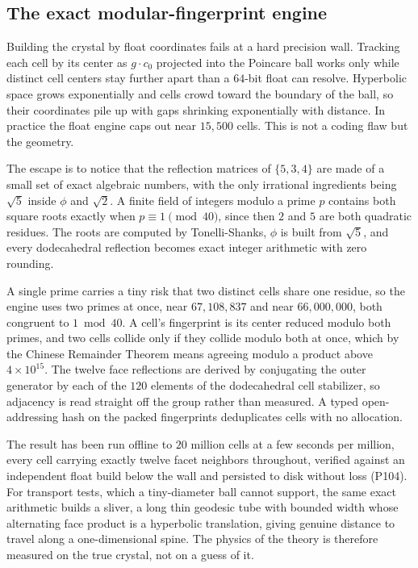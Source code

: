 \subsection{The exact modular-fingerprint engine}

Building the crystal by float coordinates fails at a hard precision wall. Tracking each cell by its center as
$g \cdot c_0$ projected into the Poincare ball works only while distinct cell centers stay further apart than
a $64$-bit float can resolve. Hyperbolic space grows exponentially and cells crowd toward the boundary of the
ball, so their coordinates pile up with gaps shrinking exponentially with distance. In practice the float
engine caps out near $15{,}500$ cells. This is not a coding flaw but the geometry.

The escape is to notice
that the reflection matrices of $\{5,3,4\}$ are made of a small set of exact algebraic numbers, with the only
irrational ingredients being $\sqrt5$ inside $\phi$ and $\sqrt2$. A finite field of integers modulo a prime
$p$ contains both square roots exactly when $p \equiv 1 \pmod{40}$, since then $2$ and $5$ are both quadratic
residues. The roots are computed by Tonelli-Shanks, $\phi$ is built from $\sqrt5$, and every dodecahedral
reflection becomes exact integer arithmetic with zero rounding.

A single prime carries a tiny risk that two
distinct cells share one residue, so the engine uses two primes at once, near $67{,}108{,}837$ and near
$66{,}000{,}000$, both congruent to $1 \bmod 40$. A cell's fingerprint is its center reduced modulo both
primes, and two cells collide only if they collide modulo both at once, which by the Chinese Remainder
Theorem means agreeing modulo a product above $4 \times 10^{15}$. The twelve face reflections are derived by
conjugating the outer generator by each of the $120$ elements of the dodecahedral cell stabilizer, so
adjacency is read straight off the group rather than measured. A typed open-addressing hash on the packed
fingerprints deduplicates cells with no allocation.

The result has been run offline to $20$ million cells at
a few seconds per million, every cell carrying exactly twelve facet neighbors throughout, verified against an
independent float build below the wall and persisted to disk without loss (P104). For transport tests, which
a tiny-diameter ball cannot support, the same exact arithmetic builds a sliver, a long thin geodesic tube
with bounded width whose alternating face product is a hyperbolic translation, giving genuine distance to
travel along a one-dimensional spine. The physics of the theory is therefore measured on the true crystal,
not on a guess of it.

